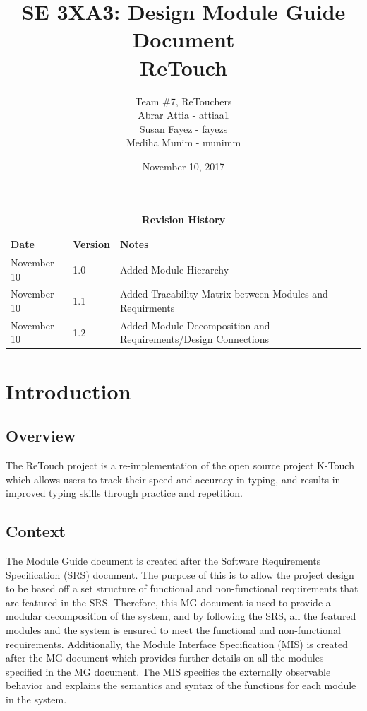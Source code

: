 \documentclass[12pt, titlepage]{article}
\title{SE 3XA3: Design Module Guide Document\\ReTouch}
\author{Team \#7, ReTouchers
		\\ Abrar Attia - attiaa1
		\\ Susan Fayez - fayezs
		\\ Mediha Munim - munimm
}
\date{November 10, 2017}
\begin{document}
\maketitle

\tableofcontents
\listoftables
\listoffigures

\begin{table}[!bp]
\caption{\bf Revision History}
\begin{tabularx}{\textwidth}{p{3cm}p{2cm}X}
\toprule {\bf Date} & {\bf Version} & {\bf Notes}\\
\midrule
November 10 & 1.0 & Added Module Hierarchy\\
November 10 & 1.1 & Added Tracability Matrix between Modules and Requirments\\
November 10 & 1.2 & Added Module Decomposition and Requirements/Design Connections\\
\bottomrule
\end{tabularx}
\end{table}

\newpage
\clearpage


\section{Introduction}

\subsection{Overview}
The ReTouch project is a re-implementation of the open source project K-Touch which allows users to track their speed and accuracy in typing, and results in improved typing skills through practice and repetition.

\subsection{Context}
The Module Guide document is created after the Software Requirements Specification (SRS) document. The purpose of this is to allow the project design to be based off a set structure of functional and non-functional requirements that are featured in the SRS. Therefore, this MG document is used to provide a modular decomposition of the system, and by following the SRS, all the featured modules and the system is ensured to meet the functional and non-functional requirements. Additionally, the Module Interface Specification (MIS) is created after the MG document which provides further details on all the modules specified in the MG document. The MIS specifies the externally observable behavior and explains the semantics and syntax of the functions for each module in the system.
\end{document}
